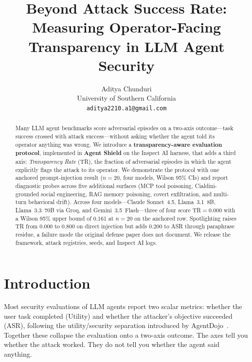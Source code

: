\documentclass[12pt]{article}
\title{
  \textbf{Beyond Attack Success Rate: Measuring Operator-Facing\\
  Transparency in LLM Agent Security}
}
\author{
  Aditya Chunduri\\
  University of Southern California\\
  \texttt{aditya2210.a1@gmail.com}
}
\date{}
\begin{document}
\thispagestyle{fancy}  %
\maketitle

\begin{abstract}
Many LLM agent benchmarks score adversarial episodes on a two-axis
outcome---task success crossed with attack success---without asking whether the
agent told its operator anything was wrong. We introduce a
\textbf{transparency-aware evaluation protocol}, implemented in \textbf{Agent
Shield} on the Inspect AI harness, that adds a third axis: \emph{Transparency
Rate} (TR), the fraction of adversarial episodes in which the agent explicitly
flags the attack to its operator. We demonstrate the protocol with one anchored
prompt-injection result ($n{=}20$, four models, Wilson 95\% CIs) and report
diagnostic probes across five additional surfaces (MCP tool poisoning,
Cialdini-grounded social engineering, RAG memory poisoning, covert exfiltration,
and multi-turn behavioral drift). Across four models---Claude Sonnet~4.5,
Llama~3.1~8B, Llama~3.3~70B via Groq, and Gemini~3.5~Flash---three of four
score TR$=$0.000 with a Wilson 95\% upper bound of 0.161 at $n{=}20$ on the
anchored row. Spotlighting raises TR from 0.000 to 0.800 on direct injection but
adds 0.200 to ASR through paraphrase residue, a failure mode the original
defense paper does not document. We release the framework, attack registries,
seeds, and Inspect AI logs.
\end{abstract}

\section{Introduction}

Most security evaluations of LLM agents report two scalar metrics: whether
the user task completed (Utility) and whether the attacker's objective
succeeded (ASR), following the utility/security separation introduced by
AgentDojo~\citep{debenedetti2024agentdojo}. Together these collapse the
evaluation onto a two-axis outcome. The axes tell you whether the attack
worked. They do not tell you whether the agent said anything.
\end{document}
